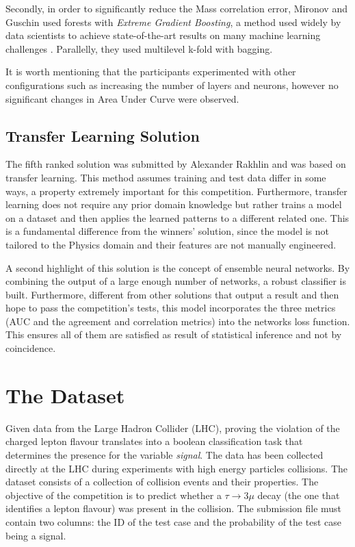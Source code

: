 \documentclass[conference]{IEEEtran}
\begin{document}
Secondly, in order to significantly reduce the Mass correlation error, Mironov and Guschin used forests with \textit{Extreme Gradient Boosting}, a method used widely by data scientists to achieve state-of-the-art results on many machine learning challenges \cite{chen2016xgboost}. Parallelly, they used multilevel k-fold with bagging.

It is worth mentioning that the participants experimented with other configurations such as increasing the number of layers and neurons, however no significant changes in Area Under Curve were observed.

\subsection{Transfer Learning Solution}
The fifth ranked solution was submitted by Alexander Rakhlin and was based on transfer learning. This method assumes training and test data differ in some ways, a property extremely important for this competition. Furthermore, transfer learning does not require any prior domain knowledge but rather trains a model on a dataset and then applies the learned patterns to a different related one. This is a fundamental difference from the winners' solution, since the model is not tailored to the Physics domain and their features are not manually engineered.

A second highlight of this solution is the concept of ensemble neural networks. By combining the output of a large enough number of networks, a robust classifier is built. Furthermore, different from other solutions that output a result and then hope to pass the competition's tests, this model incorporates the three metrics (AUC and the agreement and correlation metrics) into the networks loss function. This ensures all of them are satisfied as result of statistical inference and not by coincidence.

\section{The Dataset}
\label{sec:dataset}
Given data from the Large Hadron Collider (LHC), proving the violation of the charged lepton flavour translates into a boolean classification task that determines the presence for the variable \textit{signal}.  The data has been collected directly at the
LHC during experiments with high energy particles collisions. The dataset consists of a collection of collision events and their properties. The objective of the competition is to predict whether a $\tau \rightarrow 3\mu$ decay (the one that identifies a lepton flavour) was present in the collision. The submission file must contain two columns: the ID of the test case and the probability of the test case being a signal.
\end{document}

